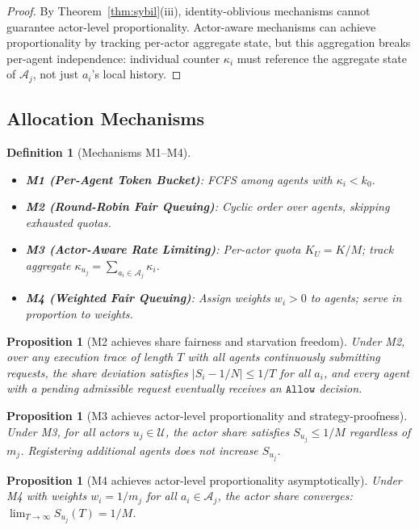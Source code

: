 \documentclass[11pt]{article}
\newtheorem{proposition}[theorem]{Proposition}
\newtheorem{definition}[theorem]{Definition}
\newcommand{\allow}{\texttt{Allow}}
\newcommand{\Agents}{\mathcal{A}}
\newcommand{\Actors}{\mathcal{U}}
\newcommand{\Share}[1]{S_{#1}}
\newcommand{\kbound}{k_0}
\newcommand{\Kcap}{K}
\begin{document}
\begin{proof}
By Theorem~\ref{thm:sybil}(iii), identity-oblivious mechanisms cannot guarantee actor-level proportionality. Actor-aware mechanisms can achieve proportionality by tracking per-actor aggregate state, but this aggregation breaks per-agent independence: individual counter $\kappa_i$ must reference the aggregate state of $\Agents_j$, not just $a_i$'s local history.
\end{proof}

\subsection{Allocation Mechanisms}

\begin{definition}[Mechanisms M1--M4]
\label{def:mechanisms}
\begin{itemize}[noitemsep]
  \item \textbf{M1 (Per-Agent Token Bucket)}: FCFS among agents with $\kappa_i < \kbound$.
  \item \textbf{M2 (Round-Robin Fair Queuing)}: Cyclic order over agents, skipping exhausted quotas.
  \item \textbf{M3 (Actor-Aware Rate Limiting)}: Per-actor quota $K_U = \Kcap/M$; track aggregate $\kappa_{u_j} = \sum_{a_i \in \Agents_j} \kappa_i$.
  \item \textbf{M4 (Weighted Fair Queuing)}: Assign weights $w_i > 0$ to agents; serve in proportion to weights.
\end{itemize}
\end{definition}

\begin{proposition}[M2 achieves share fairness and starvation freedom]
\label{prop:m2}
Under M2, over any execution trace of length $T$ with all agents continuously submitting requests, the share deviation satisfies $|\Share{i} - 1/N| \leq 1/T$ for all $a_i$, and every agent with a pending admissible request eventually receives an $\allow$ decision.
\end{proposition}

\begin{proposition}[M3 achieves actor-level proportionality and strategy-proofness]
\label{prop:m3}
Under M3, for all actors $u_j \in \Actors$, the actor share satisfies $\Share{u_j} \leq 1/M$ regardless of $m_j$. Registering additional agents does not increase $\Share{u_j}$.
\end{proposition}

\begin{proposition}[M4 achieves actor-level proportionality asymptotically]
\label{prop:m4}
Under M4 with weights $w_i = 1/m_j$ for all $a_i \in \Agents_j$, the actor share converges: $\lim_{T \to \infty} \Share{u_j}(T) = 1/M$.
\end{proposition}
\end{document}
